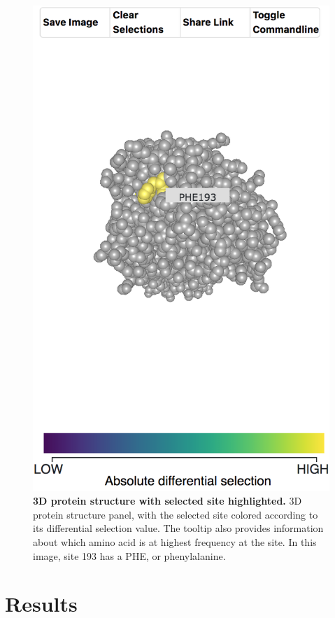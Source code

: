 \documentclass[sigchi, nonacm]{acmart}
\begin{document}
\begin{figure}[h]
	\includegraphics[width=\columnwidth]{3d-structure-panel.png}
	\caption{\textbf{3D protein structure with selected site highlighted.}
  3D protein structure panel, with the selected site colored according to its differential selection value.
The tooltip also provides information about which amino acid is at highest frequency at the site.
In this image, site 193 has a PHE, or phenylalanine.
  }
	\label{3d-structure}
\end{figure}

\section{Results}
\end{document}
